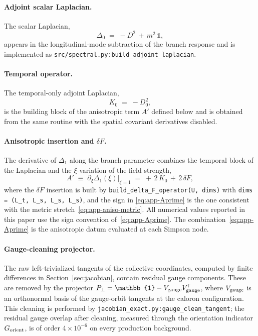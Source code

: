 \documentclass[a4paper,11pt]{article}
\theoremstyle{definition}
\begin{document}
\paragraph{Adjoint scalar Laplacian.}
The scalar Laplacian,
\begin{equation}
\Delta_0 \;=\; -D^2 \,+\, m^2\,\mathbb{1},
\label{eq:app-Delta0}
\end{equation}
appears in the longitudinal-mode subtraction of the branch response and is
implemented as \texttt{src/spectral.py:build\_adjoint\_laplacian}.

\paragraph{Temporal operator.}
The temporal-only adjoint Laplacian,
\begin{equation}
K_0 \;=\; -D_0^2,
\label{eq:app-K0}
\end{equation}
is the building block of the anisotropic term $A'$ defined below and is
obtained from the same routine with the spatial covariant derivatives
disabled.

\paragraph{Anisotropic insertion and $\delta F$.}
The derivative of $\Delta_1$ along the branch parameter combines the
temporal block of the Laplacian and the $\xi$-variation of the field
strength,
\begin{equation}
A' \;\equiv\; \partial_\xi \Delta_1(\xi)\bigr|_{\xi=1}
\;=\; +\,2\,K_0 \,+\, 2\,\delta F,
\label{eq:app-Aprime}
\end{equation}
where the $\delta F$ insertion is built by
\texttt{build\_delta\_F\_operator(U, dims)} with
\texttt{dims = (L\_t, L\_s, L\_s, L\_s)}, and the sign in
\eqref{eq:app-Aprime} is the one consistent with the metric
stretch~\eqref{eq:app-aniso-metric}. All numerical values reported in this
paper use the sign convention of~\eqref{eq:app-Aprime}. The
combination~\eqref{eq:app-Aprime} is the anisotropic datum evaluated at
each Simpson node.

\paragraph{Gauge-cleaning projector.}
The raw left-trivialized tangents of the collective coordinates, computed
by finite differences in Section~\ref{sec:jacobian}, contain residual
gauge components. These are removed by the projector
$P_\perp = \mathbb{1} - V_{\rm gauge} V_{\rm gauge}^{\!\top}$, where
$V_{\rm gauge}$ is an orthonormal basis of the gauge-orbit tangents at the
caloron configuration. This cleaning is performed by
\texttt{jacobian\_exact.py:gauge\_clean\_tangent}; the residual gauge
overlap after cleaning, measured through the orientation indicator
$G_{\rm orient}$, is of order $4\times 10^{-6}$ on every production
background.
\end{document}
